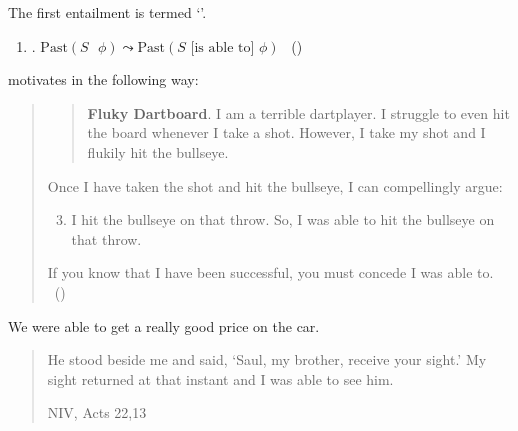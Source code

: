\begin{note}
  The first entailment is termed `\BoyPS{}'.

  \begin{enumerate}[label=]
  \item
    \label{Boylan:Past-Success}
    \BoyPS{}. \(\text{Past}(S\text{ }\phi) \leadsto \text{Past}(S\text{ [is able to] }\phi)\)%
    \mbox{ }\hfill\mbox{(\citeyear[\S1.1]{Boylan:2020aa})}
  \end{enumerate}

  \citeauthor{Boylan:2020aa} motivates \BoyPS{} in the following way:
  \begin{quote}
    \begin{quote}
      \textbf{Fluky Dartboard}.
      I am a terrible dartplayer.
      I struggle to even hit the board whenever I take a shot.
      However, I take my shot and I flukily hit the bullseye.
    \end{quote}

    Once I have taken the shot and hit the bullseye, I can compellingly argue:

    \begin{enumerate}
      \setcounter{enumi}{2}
    \item
      I hit the bullseye on that throw.\newline
      So, I was able to hit the bullseye on that throw.
    \end{enumerate}

    If you know that I have been successful, you must concede I was able to.%
    \mbox{ }\hfill\mbox{(\citeyear[2]{Boylan:2020aa})}
  \end{quote}

  We were able to get a really good price on the car.

  \begin{quote}
    He stood beside me and said, ‘Saul, my brother, receive your sight.’ My sight returned at that instant and I was able to see him.

    NIV, Acts 22,13
  \end{quote}


\end{note}

